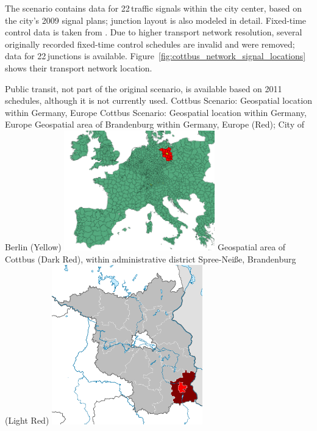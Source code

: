 The scenario contains data for 22\,traffic signals within the city center, based on the city's 2009 signal plans; junction layout is also modeled in detail. Fixed-time control data is taken from \citet{KoehlerStrehler2010SignalDemandOptimization}.  
Due to higher transport network resolution, several originally recorded fixed-time control schedules are invalid and were removed; data for 22\,junctions is available. 
Figure~\ref{fig:cottbus_network_signal_locations} shows their transport network location.  

Public transit, not part of the original scenario, is available based on 2011 schedules, although it is not currently used. 
\createfigure%
{Cottbus Scenario: Geospatial location within Germany, Europe}%
{Cottbus Scenario: Geospatial location within Germany, Europe}%
{\label{fig:scenarios:cottbus_location}}%
{%
  \createsubfigure%
	{Geospatial area of Brandenburg within Germany, Europe (Red); City of Berlin (Yellow)}
	{\includegraphics[width=0.49\textwidth]{./using/figures/brandenburg_europe.png}}
	{\label{fig:scenarios:cottbus_brandenburg_europe}}
  \createsubfigure%
	{Geospatial area of Cottbus (Dark Red), within administrative district Spree-Neiße, Brandenburg (Light Red)}
	{\includegraphics[width=0.49\textwidth]{./using/figures/brandenburg_spree_neise_cottbus.pdf}}
	{\label{fig:scenarios:cottbus_bb}}
}%
{\citet{Grether2014PhD}}

